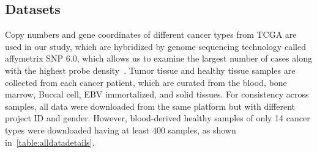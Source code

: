 

\subsection{Datasets}
\label{data}
Copy numbers and gene coordinates of different cancer types from TCGA are used in our study, which are hybridized by genome sequencing technology called {affymetrix SNP 6.0}, which allows us to examine the largest number of cases along with the highest probe density~\cite{31Park}. Tumor tissue and healthy tissue samples are collected from each cancer patient, which are curated from the blood, bone marrow, Buccal cell, EBV immortalized, and solid tissues. For consistency across samples, all data were downloaded from the same platform but with different project ID and gender. However, blood-derived healthy samples of only 14 cancer types were downloaded having at least 400 samples, as shown in~\cref{table:alldatadetails}. 

